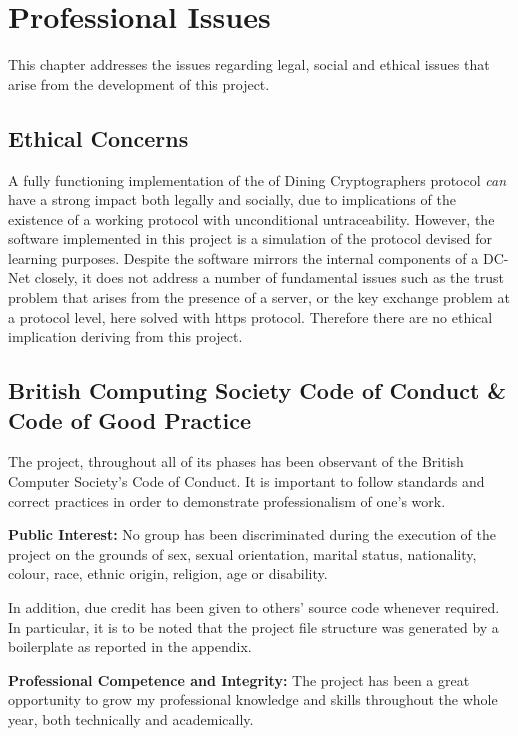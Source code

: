 \chapter{Professional Issues}
This chapter addresses the issues regarding legal, social and ethical issues that arise from the development of this project.

\section{Ethical Concerns}
A fully functioning implementation of the of Dining Cryptographers protocol \textit{can} have a strong impact both legally and socially, due to implications of the existence of a working protocol with unconditional untraceability. However, the software implemented in this project is a simulation of the protocol devised for learning purposes. Despite the software mirrors the internal components of a DC-Net closely, it does not address a number of fundamental issues such as the trust problem that arises from the presence of a server, or the key exchange problem at a protocol level, here solved with https protocol. Therefore there are no ethical implication deriving from this project.


\section{British Computing Society Code of Conduct \& Code of Good Practice}
The project, throughout all of its phases has been observant of the British Computer Society's Code of Conduct. It is important to follow standards and correct practices in order to demonstrate professionalism of one's work. \newline


\textbf{Public Interest:} No group has been discriminated during the execution of the project on the grounds of sex, sexual orientation, marital status, nationality, colour, race, ethnic origin, religion, age or disability. 

In addition, due credit has been given to others' source code whenever required. In particular, it is to be noted that the project file structure was generated by a boilerplate as reported in the appendix. \newline 

\textbf{Professional Competence and Integrity:} The project has been a great opportunity to grow my professional knowledge and skills throughout the whole year, both technically and academically. 

